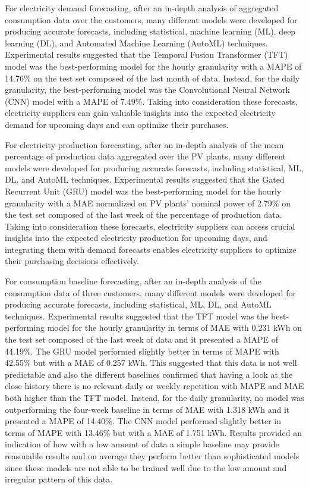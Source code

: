 For electricity demand forecasting, after an in-depth analysis of aggregated consumption data over the customers, many different models were developed for producing accurate forecasts, including statistical, machine learning (ML), deep learning (DL), and Automated Machine Learning (AutoML) techniques.
Experimental results suggested that the Temporal Fusion Transformer (TFT) model was the best-performing model for the hourly granularity with a MAPE of 14.76\% on the test set composed of the last month of data.
Instead, for the daily granularity, the best-performing model was the Convolutional Neural Network (CNN) model with a MAPE of 7.49\%.
Taking into consideration these forecasts, electricity suppliers can gain valuable insights into the expected electricity demand for upcoming days and can optimize their purchases.

For electricity production forecasting, after an in-depth analysis of the mean percentage of production data aggregated over the PV plants, many different models were developed for producing accurate forecasts, including statistical, ML, DL, and AutoML techniques.
Experimental results suggested that the Gated Recurrent Unit (GRU) model was the best-performing model for the hourly granularity with a MAE normalized on PV plants' nominal power of 2.79\% on the test set composed of the last week of the percentage of production data.
Taking into consideration these forecasts, electricity suppliers can access crucial insights into the expected electricity production for upcoming days, and integrating them with demand forecasts enables electricity suppliers to optimize their purchasing decisions effectively.

For consumption baseline forecasting, after an in-depth analysis of the consumption data of three customers, many different models were developed for producing accurate forecasts, including statistical, ML, DL, and AutoML techniques.
Experimental results suggested that the TFT model was the best-performing model for the hourly granularity in terms of MAE with 0.231 kWh on the test set composed of the last week of data and it presented a MAPE of 44.19\%.
The GRU model performed slightly better in terms of MAPE with 42.55\% but with a MAE of 0.257 kWh.
This suggested that this data is not well predictable and also the different baselines confirmed that having a look at the close history there is no relevant daily or weekly repetition with MAPE and MAE both higher than the TFT model.
Instead, for the daily granularity, no model was outperforming the four-week baseline in terms of MAE with 1.318 kWh and it presented a MAPE of 14.40\%.
The CNN model performed slightly better in terms of MAPE with 13.46\% but with a MAE of 1.751 kWh.
Results provided an indication of how with a low amount of data a simple baseline may provide reasonable results and on average they perform better than sophisticated models since these models are not able to be trained well due to the low amount and irregular pattern of this data.

